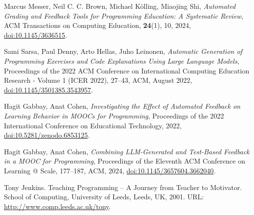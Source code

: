\documentclass{article}
\begin{document}
\begin{thebibliography}{99}

    Marcus Messer, Neil C. C. Brown, Michael Kölling, Miaojing Shi, 
    \textit{Automated Grading and Feedback Tools for Programming Education: A Systematic Review}, 
    ACM Transactions on Computing Education, \textbf{24}(1), 10, 2024, \href{https://doi.org/10.1145/3636515}{doi:10.1145/3636515}.
    
    Sami Sarsa, Paul Denny, Arto Hellas, Juho Leinonen, 
    \textit{Automatic Generation of Programming Exercises and Code Explanations Using Large Language Models}, 
    Proceedings of the 2022 ACM Conference on International Computing Education Research - Volume 1 (ICER 2022), 27--43, ACM, August 2022, \href{https://doi.org/10.1145/3501385.3543957}{doi:10.1145/3501385.3543957}.
    
    Hagit Gabbay, Anat Cohen, 
    \textit{Investigating the Effect of Automated Feedback on Learning Behavior in MOOCs for Programming}, 
    Proceedings of the 2022 International Conference on Educational Technology, 2022, \href{https://doi.org/10.5281/zenodo.6853125}{doi:10.5281/zenodo.6853125}.
    
    Hagit Gabbay, Anat Cohen, 
    \textit{Combining LLM-Generated and Test-Based Feedback in a MOOC for Programming}, 
    Proceedings of the Eleventh ACM Conference on Learning @ Scale, 177–187, ACM, 2024, \href{https://doi.org/10.1145/3657604.3662040}{doi:10.1145/3657604.3662040}.

    Tony Jenkins.
    \newblock Teaching Programming – A Journey from Teacher to Motivator.
    \newblock School of Computing, University of Leeds, Leeds, UK, 2001.
    \newblock URL: \url{http://www.comp.leeds.ac.uk/tony}.
    
\end{thebibliography}
\end{document}
